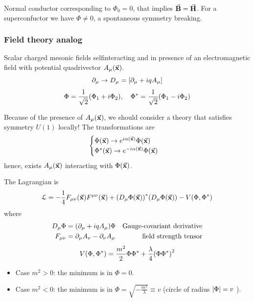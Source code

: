 \documentclass[../main/main.tex]{subfiles}
\begin{document}
Normal conductor corresponding to \( \Phi _0 = 0 \), that implies \( \va{B} = \va{H} \). For a superconfuctor we have \( \Phi \neq 0 \), a spontaneous symmetry breaking.

\subsubsection{Field theory analog}


Scalar charged mesonic fields selfinteracting and in presence of an electromagnetic field with potential quadrivector \( A_ \mu  ( \va{x}) \).
\begin{equation}
  \partial_ \mu  \rightarrow  D _ \mu = \qty[ \partial_ \mu  + i q A _ \mu  ]
\end{equation}
\begin{equation}
  \Phi = \frac{1}{\sqrt{2} } \qty(\Phi _1 + i \Phi _2), \quad \Phi ^* = \frac{1}{\sqrt{2} } \qty(\Phi _1 - i \Phi _2)
\end{equation}
\begin{remark}
Because of the presence of \( A _ \mu (\va{x}) \), we should consider a theory that satisfies symmetry \( U(1) \) locally!
The transformations are
\begin{equation}
  \begin{cases}
   \Phi  ( \va{x} ) \rightarrow e^{i \alpha (\va{x})} \Phi (\va{x}) \\
  \Phi^*  ( \va{x} ) \rightarrow e^{-i \alpha (\va{x})} \Phi (\va{x})
  \end{cases}
\end{equation}
hence, exists \( A _ \mu (\va{x}) \) interacting with \( \Phi (\va{x}) \).

The Lagrangian is
\begin{equation}
  \mathcal{L} = - \frac{1}{4} F_ {\mu  \nu } (\va{x}) F ^{ \mu \nu } (\va{x})
  + \qty(D _ \mu  \Phi (\va{x}))^* \qty(D _ \mu \Phi (\va{x}))
  - V (\Phi ,\Phi ^*)
\end{equation}
where
\begin{subequations}
\begin{align}
  D_ \mu \Phi  &= \qty(\partial_ \mu  + i q A _ \mu  ) \Phi   & \text{Gauge-covariant derivative}\\
  F_ { \mu \nu } &= \partial_ \mu  A _ \nu  - \partial _ \nu  A _ \mu & \text{field strength tensor}
\end{align}
\end{subequations}
\begin{equation}
  V (\Phi , \Phi ^*) = \frac{m^2}{2} \Phi \Phi ^* + \frac{\lambda }{4} \qty(\Phi \Phi ^*)^2
\end{equation}
\begin{itemize}
\item Case \( m^2 >0 \): the minimum is in \( \Phi =0 \).
\item Case \( m^2 < 0 \): the minimum is in \( \Phi = \sqrt{- \frac{m^2}{\lambda }} \equiv v  \)    (circle of radius \( \abs{\Phi } = v \) ).
\end{itemize}
\end{remark}
\end{document}
